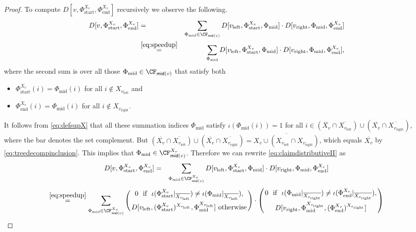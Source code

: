 \begin{proof}
To compute $D[v, \Phi_\text{start}^{X_v}, \Phi_\text{end}^{X_v}]$ recursively we observe the following.
\begin{eqnarray}\label{eq:claimdistributiveII}
D[v, \Phi_\text{start}^{X_v}, \Phi_\text{end}^{X_v}] &=& 
\sum_{\Phi_\text{mid} \in \CF_{\textsf{mid}(v)}} D[v_\text{left},\Phi_\text{start}^{X_v}, \Phi_\text{mid}] \cdot D[v_\text{right},\Phi_\text{mid}, \Phi_\text{end}^{X_{v}}]\\\nonumber
&\stackrel{\eqref{eq:speedup}}{=}& 
\sum_{\Phi_\text{mid}} D[v_\text{left},\Phi_\text{start}^{X_{v}}, \Phi_\text{mid}] \cdot D[v_\text{right},\Phi_\text{mid}, \Phi_\text{end}^{X_{v}}],
\end{eqnarray}
where the second sum is over all those $\Phi_\text{mid} \in \CF_{\textsf{mid}(v)}$ that satisfy both
\begin{itemize}
\item[$\bullet$] $\Phi_\text{start}^{X_v}(i) = \Phi_\text{mid}(i)$ for all $i \notin X_{v_\text{left}}$ and
\item[$\bullet$] $\Phi_\text{end}^{X_v}(i) = \Phi_\text{mid}(i)$ for all $i \notin X_{v_\text{right}}$.
\end{itemize}
It follows from \eqref{eq:defsupX} that all these summation indices $\Phi_\text{mid}$ satisfy $\iota(\Phi_\text{mid}(i))=1$ for all $i \in (\overline{X_v} \cap \overline{X_{v_\text{left}}})\cup(\overline{X_v} \cap \overline{X_{v_\text{right}}})$, where the bar denotes the set complement.
But $(\overline{X_v} \cap \overline{X_{v_\text{left}}})\cup(\overline{X_v} \cap \overline{X_{v_\text{right}}}) = \overline{X_v \cup (X_{v_\text{left}} \cap X_{v_\text{right}})}$, which equals $\overline{X_v}$ by \eqref{eq:treedecompinclusion}. This implies that $\Phi_\text{mid} \in \CF_{\textsf{mid}(v)}^{X_v}$.
Therefore we can rewrite \eqref{eq:claimdistributiveII} as
\begin{eqnarray*}
D[v, \Phi_\text{start}^{X_v}, \Phi_\text{end}^{X_v}] &=& 
\sum_{\Phi_\text{mid} \in \CF^{X_v}_{\textsf{mid}(v)}} D[v_\text{left},\Phi_\text{start}^{X_v}, \Phi_\text{mid}] \cdot D[v_\text{right},\Phi_\text{mid}, \Phi_\text{end}^{X_{v}}]
\end{eqnarray*}
\begin{eqnarray*}
\stackrel{\eqref{eq:speedup}}{=}\sum_{\Phi_\text{mid} \in \CF^{X_v}_{\textsf{mid}(v)}}
\left(
0 \ \text{ if } \ \iota(\Phi_\text{start}^{X_v}|_{\overline{X_{v_\text{left}}}})\neq\iota(\Phi_\text{mid}|_{\overline{X_{v_\text{left}}}}),
\atop
D[v_\text{left},(\Phi_\text{start}^{X_v})^{X_{v_\text{left}}}, \Phi_\text{mid}^{X_{v_\text{left}}}] \text{ otherwise}
\right)
\cdot
\left(
0 \ \text{ if } \ \iota(\Phi_\text{mid}|_{\overline{X_{v_\text{right}}}})\neq\iota(\Phi_\text{end}^{X_v}|_{\overline{X_{v_\text{right}}}}),
\atop
D[v_\text{right},\Phi_\text{mid}^{X_{v_\text{right}}}, (\Phi_\text{end}^{X_v})^{X_{v_\text{right}}}]
\right)
\end{eqnarray*}


\end{proof}
